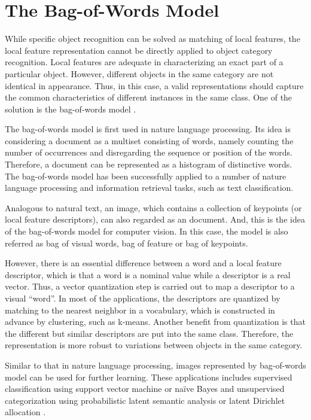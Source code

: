 \documentclass[12pt,final,twoside]{report}
\theoremstyle{plain}
\theoremstyle{definition}
\theoremstyle{remark}
\begin{document}
\section{The Bag-of-Words Model}
While specific object recognition can be solved as matching of local features, the local feature representation cannot be directly applied to object category recognition. Local features are adequate in characterizing an exact part of a particular object. However, different objects in the same category are not identical in appearance. Thus, in this case, a valid representations should capture the common characteristics of different instances in the same class. One of the solution is the bag-of-words model \cite{csurka_visual_2004}.

The bag-of-words model is first used in nature language processing. Its idea is considering a document as a multiset consisting of words, namely counting the number of occurrences and disregarding the sequence or position of the words. Therefore, a document can be represented as a histogram of distinctive words. The bag-of-words model has been successfully applied to a number of nature language processing and information retrieval tasks, such as text classification.

Analogous to natural text, an image, which contains a collection of keypoints (or local feature descriptors), can also regarded as an document. And, this is the idea of the bag-of-words model for computer vision. In this case, the model is also referred as bag of visual words, bag of feature or bag of keypoints. 

However, there is an essential difference between a word and a local feature descriptor, which is that a word is a nominal value while a descriptor is a real vector. Thus, a vector quantization step is carried out to map a descriptor to a visual ``word''. In most of the applications, the descriptors are quantized by matching to the nearest neighbor in a vocabulary, which is constructed in advance by clustering, such as k-means. Another benefit from quantization is that the different but similar descriptors are put into the same class. Therefore, the representation is more robust to variations between objects in the same category.

Similar to that in nature language processing, images represented by bag-of-words model can be used for further learning. These applications includes supervised classification using support vector machine or na\"ive Bayes \cite{csurka_visual_2004} and unsupervised categorization using probabilistic latent semantic analysis or latent Dirichlet allocation \cite{sivic_discovering_2005}.
\end{document}
